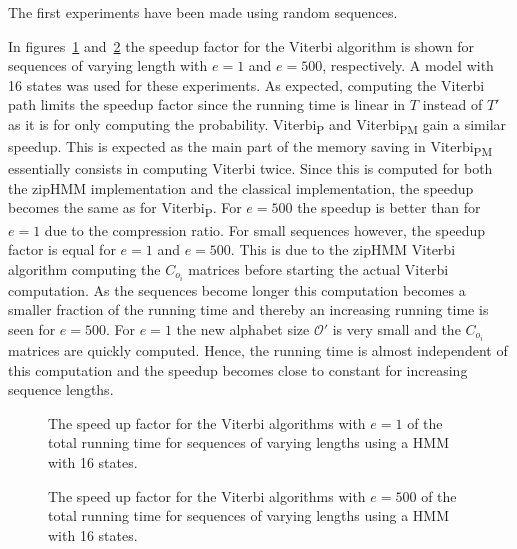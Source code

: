 The first experiments have been made using random sequences.

In figures~\ref{fig:compressed_1_speedup_vs_sequence_length}
and~\ref{fig:compressed_500_speedup_vs_sequence_length} the speedup factor for
the Viterbi algorithm is shown for sequences of varying length with $e = 1$ and
$e = 500$, respectively. A model with 16 states was used for these experiments.
As expected, computing the Viterbi path limits the speedup factor since the
running time is linear in $T$ instead of $T'$ as it is for only computing the
probability. Viterbi\textsubscript{P} and Viterbi\textsubscript{PM} gain a
similar speedup. This is expected as the main part of the memory saving in
Viterbi\textsubscript{PM} essentially consists in computing Viterbi twice.
Since this is computed for both the zipHMM implementation and the classical
implementation, the speedup becomes the same as for Viterbi\textsubscript{P}.
For $e = 500$ the speedup is better than for $e = 1$ due to the compression
ratio. For small sequences however, the speedup factor is equal for $e = 1$ and
$e = 500$. This is due to the zipHMM Viterbi algorithm computing the $C_{o_i}$
matrices before starting the actual Viterbi computation. As the sequences
become longer this computation becomes a smaller fraction of the running time
and thereby an increasing running time is seen for $e = 500$. For $e = 1$ the
new alphabet size $\mathcal{O'}$ is very small and the $C_{o_i}$ matrices are
quickly computed. Hence, the running time is almost independent of this
computation and the speedup becomes close to constant for increasing sequence
lengths.

\begin{figure}
  \centering
  
  \caption{The speed up factor for the Viterbi algorithms with $e = 1$ of the
    total running time for sequences of varying lengths using a HMM with 16
    states.}
  \label{fig:compressed_1_speedup_vs_sequence_length}
\end{figure}

\begin{figure}
  \centering
  
  \caption{The speed up factor for the Viterbi algorithms with $e = 500$ of the
    total running time for sequences of varying lengths using a HMM with 16
    states.}
  \label{fig:compressed_500_speedup_vs_sequence_length}
\end{figure}

